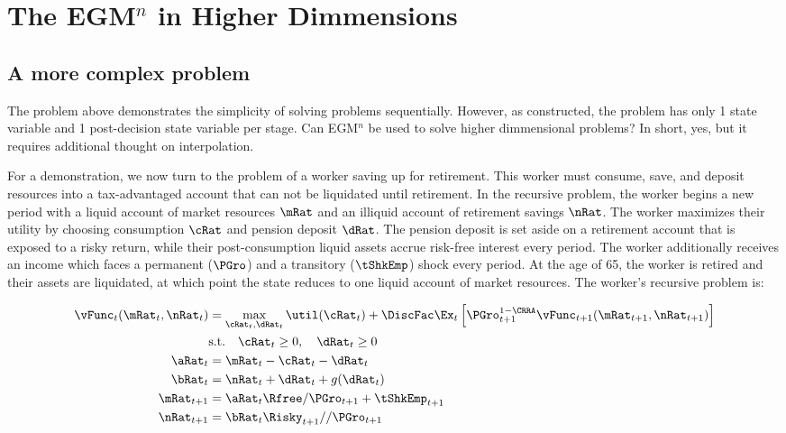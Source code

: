 \documentclass[\econtexRoot/SequentialEGM]{subfiles}
\begin{document}
\hypertarget{parameterizing-the-model}{}\par\section{The EGM$^n$ in Higher Dimmensions}

\subsection{A more complex problem}

The problem above demonstrates the simplicity of solving problems sequentially. However, as constructed, the problem has only 1 state variable and 1 post-decision state variable per stage. Can EGM$^n$ be used to solve higher dimmensional problems? In short, yes, but it requires additional thought on interpolation.

For a demonstration, we now turn to the problem of a worker saving up for retirement. This worker must consume, save, and deposit resources into a tax-advantaged account that can not be liquidated until retirement. In the recursive problem, the worker begins a new period with a liquid account of market resources $\mRat$ and an illiquid account of retirement savings $\nRat$. The worker maximizes their utility by choosing consumption $\cRat$ and pension deposit $\dRat$. The pension deposit is set aside on a retirement account that is exposed to a risky return, while their post-consumption liquid assets accrue risk-free interest every period. The worker additionally receives an income which faces a permanent ($\PGro$) and a transitory ($\tShkEmp$) shock every period. At the age of 65, the worker is retired and their assets are liquidated, at which point the state reduces to one liquid account of market resources. The worker's recursive problem is:

\providecommand{\lRat}{\ensuremath{l}}

\begin{equation}
  \begin{split}
    \vFunc_{t}(\mRat_{t}, \nRat_{t}) & = \max_{\cRat_{t}, \dRat_{t}} \util(\cRat_{t}) + \DiscFac \Ex_{t} \left[ \PGro_{t+1}^{1-\CRRA} \vFunc_{t+1}(\mRat_{t+1}, \nRat_{t+1}) \right] \\
    & \text{s.t.} \quad \cRat_{t} \ge 0, \quad \dRat_{t} \ge 0 \\
    \aRat_{t} & = \mRat_{t} - \cRat_{t} - \dRat_{t} \\
    \bRat_{t} & = \nRat_{t} + \dRat_{t} + g(\dRat_{t}) \\
    \mRat_{t+1} & = \aRat_{t} \Rfree / \PGro_{t+1}  + \tShkEmp_{t+1} \\
    \nRat_{t+1} & = \bRat_{t} \Risky_{t+1} / / \PGro_{t+1}
  \end{split}
\end{equation}
\end{document}
